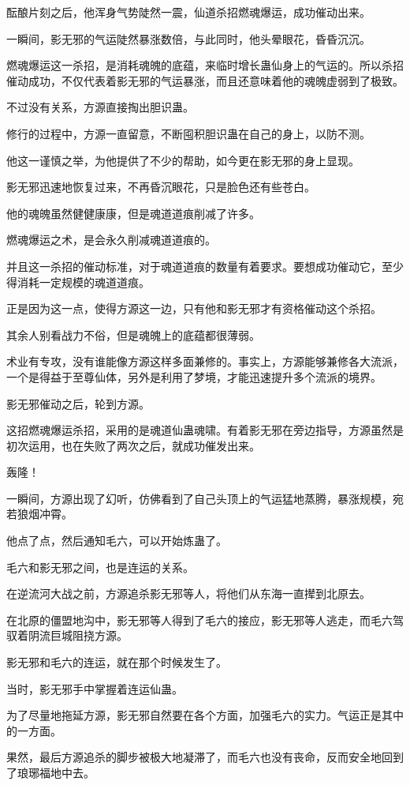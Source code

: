\begin{this_body}
酝酿片刻之后，他浑身气势陡然一震，仙道杀招燃魂爆运，成功催动出来。

一瞬间，影无邪的气运陡然暴涨数倍，与此同时，他头晕眼花，昏昏沉沉。

燃魂爆运这一杀招，是消耗魂魄的底蕴，来临时增长蛊仙身上的气运的。所以杀招催动成功，不仅代表着影无邪的气运暴涨，而且还意味着他的魂魄虚弱到了极致。

不过没有关系，方源直接掏出胆识蛊。

修行的过程中，方源一直留意，不断囤积胆识蛊在自己的身上，以防不测。

他这一谨慎之举，为他提供了不少的帮助，如今更在影无邪的身上显现。

影无邪迅速地恢复过来，不再昏沉眼花，只是脸色还有些苍白。

他的魂魄虽然健健康康，但是魂道道痕削减了许多。

燃魂爆运之术，是会永久削减魂道道痕的。

并且这一杀招的催动标准，对于魂道道痕的数量有着要求。要想成功催动它，至少得消耗一定规模的魂道道痕。

正是因为这一点，使得方源这一边，只有他和影无邪才有资格催动这个杀招。

其余人别看战力不俗，但是魂魄上的底蕴都很薄弱。

术业有专攻，没有谁能像方源这样多面兼修的。事实上，方源能够兼修各大流派，一个是得益于至尊仙体，另外是利用了梦境，才能迅速提升多个流派的境界。

影无邪催动之后，轮到方源。

这招燃魂爆运杀招，采用的是魂道仙蛊魂啸。有着影无邪在旁边指导，方源虽然是初次运用，也在失败了两次之后，就成功催发出来。

轰隆！

一瞬间，方源出现了幻听，仿佛看到了自己头顶上的气运猛地蒸腾，暴涨规模，宛若狼烟冲霄。

他点了点，然后通知毛六，可以开始炼蛊了。

毛六和影无邪之间，也是连运的关系。

在逆流河大战之前，方源追杀影无邪等人，将他们从东海一直撵到北原去。

在北原的僵盟地沟中，影无邪等人得到了毛六的接应，影无邪等人逃走，而毛六驾驭着阴流巨城阻挠方源。

影无邪和毛六的连运，就在那个时候发生了。

当时，影无邪手中掌握着连运仙蛊。

为了尽量地拖延方源，影无邪自然要在各个方面，加强毛六的实力。气运正是其中的一方面。

果然，最后方源追杀的脚步被极大地凝滞了，而毛六也没有丧命，反而安全地回到了琅琊福地中去。


\end{this_body}
